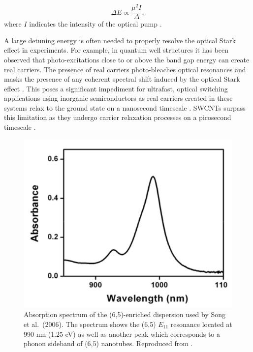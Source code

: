 
\begin{equation}
		\Delta E \propto \frac{\mu^2 I}{\Delta},
		\label{eq:ose_blueshift}
\end{equation}
where $I$ indicates the intensity of the optical pump \cite{combescot1992semiconductors}.

A large detuning energy is often needed to properly resolve the optical Stark effect in experiments. For example, in quantum well structures it has been observed that photo-excitations close to or above the band gap energy can create real carriers. The presence of real carriers photo-bleaches optical resonances and masks the presence of any coherent spectral shift induced by the optical Stark effect \cite{peyghambarian1984blue}. This poses a significant impediment for ultrafast, optical switching applications using inorganic semiconductors as real carriers created in these systems relax to the ground state on a nanosecond timescale \cite{maeda2006gigantic}. SWCNTs surpass this limitation as they undergo carrier relaxation processes on a picosecond timescale \cite{ostojic2004interband, wang2004observation, manzoni2005intersubband, maeda2006gigantic}.

\begin{figure}[ht]
	\centering
	\includegraphics[scale=0.4]{images/chapter_prior_works/absorption_spectrum_song_2006}
	\caption{Absorption spectrum of the (6,5)-enriched dispersion used by Song et al.\ (2006). The spectrum shows the (6,5) $E_{11}$ resonance located at 990 nm (1.25 eV) as well as another peak which corresponds to a phonon sideband of (6,5) nanotubes. Reproduced from \cite{song2006optical}.}
	\label{fig:abs_song_2006}
\end{figure}

